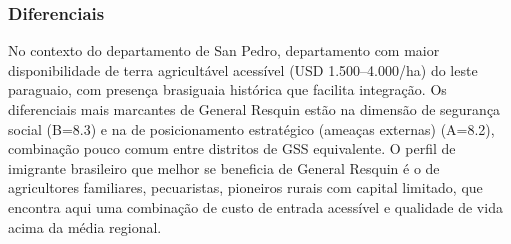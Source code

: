 \subsubsection*{Diferenciais}\label{dif-general-resquin-0205}
No contexto do departamento de San Pedro, departamento com maior disponibilidade de terra agricultável acessível (USD 1.500–4.000/ha) do leste paraguaio, com presença brasiguaia histórica que facilita integração. Os diferenciais mais marcantes de General Resquin estão na dimensão de segurança social (B=8.3) e na de posicionamento estratégico (ameaças externas) (A=8.2), combinação pouco comum entre distritos de GSS equivalente. O perfil de imigrante brasileiro que melhor se beneficia de General Resquin é o de agricultores familiares, pecuaristas, pioneiros rurais com capital limitado, que encontra aqui uma combinação de custo de entrada acessível e qualidade de vida acima da média regional.
